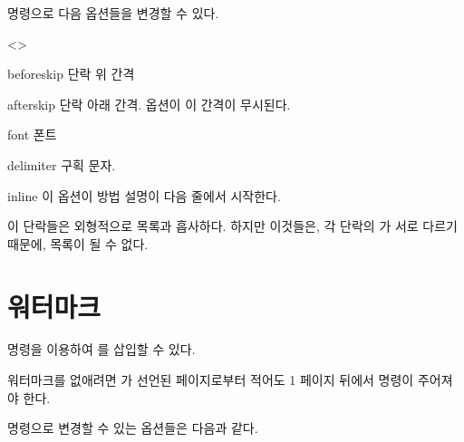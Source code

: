 \documentclass[pairquote, minted]{hzguide}
\begin{document}
\begin{code}
\end{code}

\macro{\ActionSetup} 명령으로 다음 옵션들을 변경할 수 있다.

\begin{macros}<\ActionSetup>
\item[beforeskip] \keyvalue{0.5\hzparksip}
단락 위 간격

\item[afterskip] \keyvalue{-\hzparksip}
단락 아래 간격.  옵션이  이 간격이 무시된다.

\item[font] \keyvalue{\bfseries}
폰트 

\item[delimiter] \keyvalue{:, \quad}
구획 문자.

\item[inline] \keyvalueTF
이 옵션이  방법 설명이 다음 줄에서 시작한다.
\end{macros}

이 단락들은 외형적으로 목록과 흡사하다.
하지만 이것들은, 각 단락의 가 서로 다르기 때문에, 목록이 될 수 없다. 

\section{워터마크}

\macro{\watermark} 명령을 이용하여 를 삽입할 수 있다.

\begin{code}
\end{code}
\codeinput

워터마크를 없애려면 \macro{\watermark}가 선언된 페이지로부터 적어도 1 페이지 뒤에서 \macro{\ClearWatermark} 명령이 주어져야 한다.

\begin{code}
\ClearWatermark
\end{code}

\macro{\WatermarkSetup} 명령으로 변경할 수 있는 옵션들은 다음과 같다.
\end{document}

